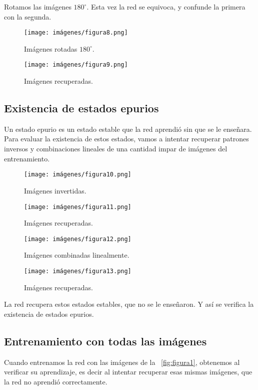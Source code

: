 \documentclass[a4paper,12pt]{article}
\begin{document}
Rotamos las imágenes $180^{\circ}$. Esta vez la red se equivoca, y confunde la primera con la segunda.

\begin{figure}[h]
    \centering
    \texttt{[image: imágenes/figura8.png]}
    \caption{Imágenes rotadas $180^{\circ}$.}
    \label{fig:figura8}
\end{figure}

\begin{figure}[h]
    \centering
    \texttt{[image: imágenes/figura9.png]}
    \caption{Imágenes recuperadas.}
    \label{fig:figura9}
\end{figure}

\subsection{Existencia de estados epurios}
Un estado epurio es un estado estable que la red aprendió sin que se le enseñara. Para evaluar la existencia de estos estados, vamos a intentar recuperar patrones inversos y combinaciones lineales de una cantidad impar de imágenes del entrenamiento.

\begin{figure}[h]
    \centering
    \texttt{[image: imágenes/figura10.png]}
    \caption{Imágenes invertidas.}
    \label{fig:figura10}
\end{figure}

\begin{figure}[h]
    \centering
    \texttt{[image: imágenes/figura11.png]}
    \caption{Imágenes recuperadas.}
    \label{fig:figura11}
\end{figure}

\begin{figure}[h]
    \centering
    \texttt{[image: imágenes/figura12.png]}
    \caption{Imágenes combinadas linealmente.}
    \label{fig:figura12}
\end{figure}

\begin{figure}[h]
    \centering
    \texttt{[image: imágenes/figura13.png]}
    \caption{Imágenes recuperadas.}
    \label{fig:figura13}
\end{figure}

La red recupera estos estados estables, que no se le enseñaron. Y así se verifica la existencia de estados epurios.

\subsection{Entrenamiento con todas las imágenes}
Cuando entrenamos la red con las imágenes de la ~\ref{fig:figura1}, obtenemos al verificar su aprendizaje, es decir al intentar recuperar esas mismas imágenes, que la red no aprendió correctamente.
\end{document}
